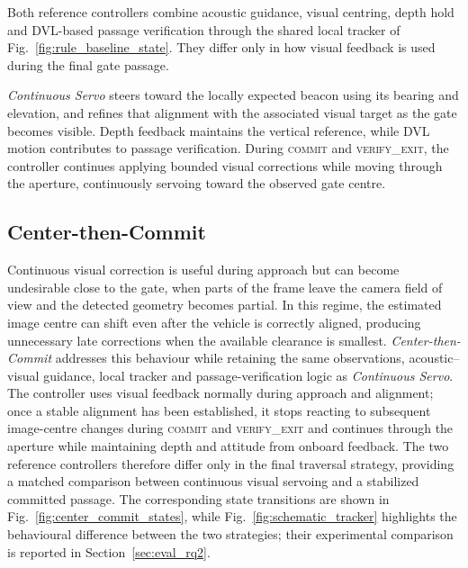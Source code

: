 Both reference controllers combine acoustic guidance, visual centring, depth
hold and DVL-based passage verification through the shared local tracker of
Fig.~\ref{fig:rule_baseline_state}. They differ only in how visual feedback is
used during the final gate passage.

\emph{Continuous Servo} steers toward the locally expected beacon using its
bearing and elevation, and refines that alignment with the associated visual
target as the gate becomes visible. Depth feedback maintains the vertical
reference, while DVL motion contributes to passage verification. During
\textsc{commit} and \textsc{verify\_exit}, the controller continues applying
bounded visual corrections while moving through the aperture, continuously
servoing toward the observed gate centre.

\subsection{Center-then-Commit}
\label{sec:center_commit_baseline}

Continuous visual correction is useful during approach but can become
undesirable close to the gate, when parts of the frame leave the camera field of
view and the detected geometry becomes partial. In this regime, the estimated
image centre can shift even after the vehicle is correctly aligned, producing
unnecessary late corrections when the available clearance is smallest.
\emph{Center-then-Commit} addresses this behaviour while retaining the same
observations, acoustic--visual guidance, local tracker and passage-verification
logic as \emph{Continuous Servo}. The controller uses visual feedback normally
during approach and alignment; once a stable alignment has been established, it
stops reacting to subsequent image-centre changes during \textsc{commit} and
\textsc{verify\_exit} and continues through the aperture while maintaining depth
and attitude from onboard feedback. The two reference controllers therefore
differ only in the final traversal strategy, providing a matched comparison
between continuous visual servoing and a stabilized committed passage. The
corresponding state transitions are shown in
Fig.~\ref{fig:center_commit_states}, while Fig.~\ref{fig:schematic_tracker}
highlights the behavioural difference between the two strategies; their
experimental comparison is reported in Section~\ref{sec:eval_rq2}.



